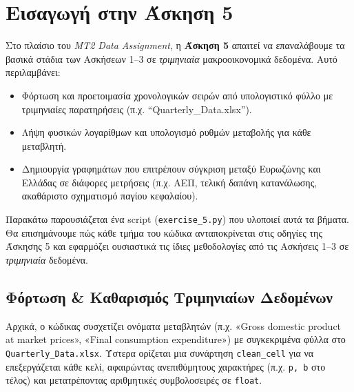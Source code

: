 \documentclass{book}
\begin{document}
\chapter{Εισαγωγή στην Άσκηση 5}
Στο πλαίσιο του \emph{MT2 Data Assignment}, η \textbf{Άσκηση 5} απαιτεί να επαναλάβουμε τα βασικά στάδια των Ασκήσεων 1--3 σε \emph{τριμηνιαία} μακροοικονομικά δεδομένα. Αυτό περιλαμβάνει:

\begin{itemize}
    \item Φόρτωση και προετοιμασία χρονολογικών σειρών από υπολογιστικό φύλλο με τριμηνιαίες παρατηρήσεις (π.χ. “Quarterly\_Data.xlsx”).
    \item Λήψη φυσικών λογαρίθμων και υπολογισμό ρυθμών μεταβολής για κάθε μεταβλητή.
    \item Δημιουργία γραφημάτων που επιτρέπουν σύγκριση μεταξύ Ευρωζώνης και Ελλάδας σε διάφορες μετρήσεις (π.χ. ΑΕΠ, τελική δαπάνη κατανάλωσης, ακαθάριστο σχηματισμό παγίου κεφαλαίου).
\end{itemize}

Παρακάτω παρουσιάζεται ένα script (\texttt{exercise\_5.py}) που υλοποιεί αυτά τα βήματα. Θα επισημάνουμε πώς κάθε τμήμα του κώδικα ανταποκρίνεται στις οδηγίες της Άσκησης 5 και εφαρμόζει ουσιαστικά τις ίδιες μεθοδολογίες από τις Ασκήσεις 1--3 σε \emph{τριμηνιαία} δεδομένα.

\section{Φόρτωση \& Καθαρισμός Τριμηνιαίων Δεδομένων}
Αρχικά, ο κώδικας συσχετίζει ονόματα μεταβλητών (π.χ. «Gross domestic product at market prices», «Final consumption expenditure») με συγκεκριμένα φύλλα στο \texttt{Quarterly\_Data.xlsx}. Ύστερα ορίζεται μια συνάρτηση \texttt{clean\_cell} για να επεξεργάζεται κάθε κελί, αφαιρώντας ανεπιθύμητους χαρακτήρες (π.χ. \texttt{p, b} στο τέλος) και μετατρέποντας αριθμητικές συμβολοσειρές σε \texttt{float}.
\end{document}
